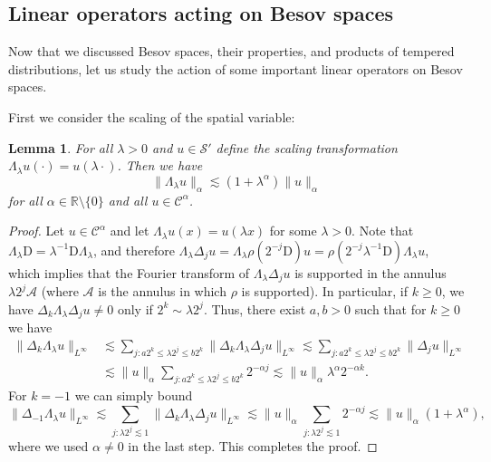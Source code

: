 \documentclass[11pt,a4paper]{article}
\newcommand{\mathD}{\mathrm{D}}
\newtheorem{lemma}[theorem]{Lemma}
\theoremstyle{remark}
\newcommand{\CA}{\ensuremath{\mathscr{A}}}
\newcommand{\CC}{\ensuremath{\mathscr{C}}}
\newcommand{\CS}{\ensuremath{\mathscr{S}}}
\begin{document}
\subsection{Linear operators acting on Besov spaces}

Now that we discussed Besov spaces, their properties, and products of tempered distributions, let us study the action of some important linear operators on Besov spaces.

First we consider the scaling of the spatial variable:

\begin{lemma}\label{lemma:scaling}
  For all $\lambda >0$ and $u \in \CS'$ define the scaling transformation $\Lambda_{\lambda} u ( \cdot ) =u ( \lambda \cdot )$. Then we have
  \[
     \| \Lambda_{\lambda} u \|_{\alpha} \lesssim ( 1+ \lambda^{\alpha} ) \| u \|_{\alpha}
  \]
  for all $\alpha \in \mathbb{R} \setminus \{ 0 \}$ and all $u \in \CC^{\alpha}$.
\end{lemma}

\begin{proof}
  Let $u \in \CC^{\alpha}$ and let $\Lambda_{\lambda} u ( x ) =u ( \lambda x )$ for some $\lambda >0$. Note that $\Lambda_{\lambda} \mathD =  \lambda^{-1} \mathD \Lambda_{\lambda}$, and therefore $\Lambda_{\lambda} \Delta_{j} u= \Lambda_{\lambda} \rho ( 2^{-j} \mathD ) u= \rho ( 2^{-j} \lambda^{-1} \mathD ) \Lambda_{\lambda} u$, which implies that the Fourier transform of $\Lambda_{\lambda} \Delta_{j} u$ is supported in the annulus $\lambda 2^{j} \CA$ (where $\CA$ is the annulus in which $\rho$ is supported). In particular, if $k \geqslant 0$, we have $\Delta_{k} \Lambda_{\lambda} \Delta_{j} u \neq 0$ only if $2^{k} \sim \lambda 2^{j}$. Thus, there exist $a,b>0$ such that for $k \geqslant 0$ we have
  \begin{align*}
     \| \Delta_{k} \Lambda_{\lambda} u \|_{L^{\infty}} & \lesssim \sum_{j:a2^{k} \leqslant \lambda 2^{j} \leqslant b2^{k}} \| \Delta_{k} \Lambda_{\lambda} \Delta_{j} u \|_{L^{\infty}} \lesssim \sum_{j:a2^{k} \leqslant \lambda 2^{j} \leqslant b2^{k}} \| \Delta_{j} u \|_{L^{\infty}} \\
     & \lesssim \| u \|_{\alpha} \sum_{j:a2^{k} \leqslant \lambda 2^{j} \leqslant b2^{k}} 2^{- \alpha j} \lesssim \| u \|_{\alpha} \lambda^{\alpha} 2^{- \alpha k} .
  \end{align*}
  For $k=-1$ we can simply bound
  \[
     \| \Delta_{-1} \Lambda_{\lambda} u \|_{L^{\infty}} \lesssim \sum_{j: \lambda 2^{j} \lesssim 1} \| \Delta_{k} \Lambda_{\lambda} \Delta_{j} u \|_{L^{\infty}} \lesssim \| u \|_{\alpha} \sum_{j: \lambda 2^{j} \lesssim 1} 2^{- \alpha j} \lesssim \| u \|_{\alpha} ( 1+ \lambda^{\alpha} ),
  \]
  where we used $\alpha \neq 0$ in the last step. This completes the proof.
\end{proof}
\end{document}
